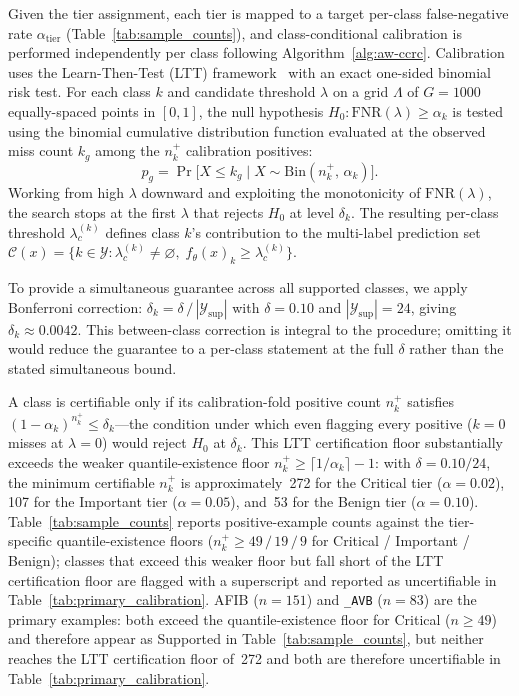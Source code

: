Given the tier assignment, each tier is mapped to a target per-class
false-negative rate $\alpha_\mathrm{tier}$ (Table~\ref{tab:sample_counts}), and
class-conditional calibration is performed independently per class following
Algorithm~\ref{alg:aw-ccrc}.
Calibration uses the Learn-Then-Test (LTT) framework~\cite{angelopoulos2021ltt}
with an exact one-sided binomial risk test.
For each class $k$ and candidate threshold $\lambda$ on a grid $\Lambda$ of
$G{=}1000$ equally-spaced points in $[0,1]$, the null hypothesis
$H_0\colon\mathrm{FNR}(\lambda)\ge\alpha_k$ is tested using the binomial cumulative
distribution function evaluated at the observed miss count $k_g$ among the $n_k^+$
calibration positives:
\[
  p_g = \Pr\!\bigl[X \le k_g \;\big|\; X \sim \mathrm{Bin}(n_k^+,\,\alpha_k)\bigr].
\]
Working from high $\lambda$ downward and exploiting the monotonicity of
$\mathrm{FNR}(\lambda)$, the search stops at the first $\lambda$ that rejects $H_0$
at level $\delta_k$.
The resulting per-class threshold $\lambda_c^{(k)}$ defines class $k$'s contribution
to the multi-label prediction set
$\mathcal{C}(x) = \{k\in\mathcal{Y} :
  \lambda_c^{(k)}\neq\varnothing,\;f_\theta(x)_k\ge\lambda_c^{(k)}\}$.

To provide a simultaneous guarantee across all supported classes, we apply
Bonferroni correction: $\delta_k = \delta\,/\,|\mathcal{Y}_\mathrm{sup}|$ with
$\delta{=}0.10$ and $|\mathcal{Y}_\mathrm{sup}|{=}24$, giving
$\delta_k\approx 0.0042$.
This between-class correction is integral to the procedure; omitting it would reduce
the guarantee to a per-class statement at the full $\delta$ rather than the stated
simultaneous bound.

A class is certifiable only if its calibration-fold positive count $n_k^+$ satisfies
$(1-\alpha_k)^{n_k^+}\le\delta_k$---the condition under which even flagging every
positive ($k{=}0$ misses at $\lambda{=}0$) would reject $H_0$ at $\delta_k$.
This LTT certification floor substantially exceeds the weaker quantile-existence
floor $n_k^+\ge\lceil 1/\alpha_k\rceil-1$: with $\delta{=}0.10/24$, the minimum
certifiable $n_k^+$ is approximately~272 for the Critical tier ($\alpha{=}0.02$),
107 for the Important tier ($\alpha{=}0.05$), and~53 for the Benign tier
($\alpha{=}0.10$).
Table~\ref{tab:sample_counts} reports positive-example counts against the
tier-specific quantile-existence floors ($n_k^+\ge 49\,/\,19\,/\,9$ for Critical /
Important / Benign); classes that exceed this weaker floor but fall short of the LTT
certification floor are flagged with a superscript and reported as uncertifiable in
Table~\ref{tab:primary_calibration}.
AFIB ($n{=}151$) and \texttt{\_AVB} ($n{=}83$) are the primary examples: both exceed
the quantile-existence floor for Critical ($n\ge 49$) and therefore appear as
Supported in Table~\ref{tab:sample_counts}, but neither reaches the LTT
certification floor of~272 and both are therefore uncertifiable in
Table~\ref{tab:primary_calibration}.

